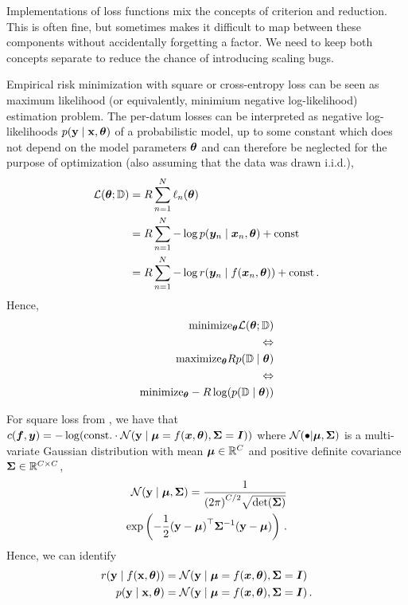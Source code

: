 \begin{caveat}
  Implementations of loss functions mix the concepts of criterion and reduction.
  This is often fine, but sometimes makes it difficult to map between these components without accidentally forgetting a factor.
  We need to keep both concepts separate to reduce the chance of introducing scaling bugs.
\end{caveat}

Empirical risk minimization with square or cross-entropy loss can be seen as maximum likelihood (or equivalently, minimium negative log-likelihood) estimation problem.
The per-datum losses can be interpreted as negative log-likelihoods $p({\mathbf{y}} \mid {\mathbf{x}}, {\bm{\theta}})$ of a probabilistic model, up to some constant which does not depend on the model parameters ${\bm{\theta}}$ and can therefore be neglected for the purpose of optimization (also assuming that the data was drawn i.i.d.),
\begin{align*}
  {\mathcal{L}}({\bm{\theta}}; {\mathbb{D}})
  &=
    R \sum_{n=1}^N \ell_n({\bm{\theta}})
  \\
  &=
    R \sum_{n=1}^N - \log p({\bm{y}}_n \mid {\bm{x}}_n, {\bm{\theta}}) + \text{const}
  \\
  &=
    R \sum_{n=1}^N - \log r({\bm{y}}_n \mid f({\bm{x}}_n, {\bm{\theta}})) + \text{const}\,.
\end{align*}
Hence,
\begin{align*}
  \mathrm{minimize}_{{\bm{\theta}}} {\mathcal{L}}({\bm{\theta}}; {\mathbb{D}})
  \\
  \Leftrightarrow
  \\
  \mathrm{maximize}_{{\bm{\theta}}} R p({\mathbb{D}} \mid {\bm{\theta}})
  \\
  \Leftrightarrow
  \\
  \mathrm{minimize}_{{\bm{\theta}}} - R \log(p({\mathbb{D}} \mid {\bm{\theta}}))
\end{align*}

\begin{example}
  For square loss from , we have that $c({\bm{f}}, {\bm{y}}) = - \log( \mathrm{const.}
  \cdot {\mathcal{N}}({\mathbf{y}} \mid {\bm{\mu}} = f({\bm{x}}, {\bm{\theta}}), {\bm{\Sigma}} = {\bm{I}}))$ where ${\mathcal{N}}(\bullet | {\bm{\mu}}, {\bm{\Sigma}})$ is a multi-variate Gaussian distribution with mean ${\bm{\mu}} \in {\mathbb{R}}^C$ and positive definite covariance ${\bm{\Sigma}} \in {\mathbb{R}}^{C \times C}$,
  \begin{align*}
    {\mathcal{N}}({\mathbf{y}} \mid {\bm{\mu}}, {\bm{\Sigma}})
    =
    \frac{1}{{(2\pi)}^{C/2} \sqrt{\det({\bm{\Sigma}})}}
    \\
    \exp\left( -\frac{1}{2} {({\mathbf{y}} - {\bm{\mu}})}^\top {\bm{\Sigma}}^{-1} ({\mathbf{y}} - {\bm{\mu}}) \right)\,.
  \end{align*}
  Hence, we can identify
  \begin{align*}
    r({\mathbf{y}} \mid f({\mathbf{x}}, {\bm{\theta}})) &= {\mathcal{N}}({\mathbf{y}} \mid {\bm{\mu}} = f({\bm{x}}, {\bm{\theta}}), {\bm{\Sigma}} = {\bm{I}})\,
    \\
    p({\mathbf{y}} \mid {\mathbf{x}}, {\bm{\theta}}) &= {\mathcal{N}}({\mathbf{y}} \mid {\bm{\mu}} = f({\bm{x}}, {\bm{\theta}}), {\bm{\Sigma}} = {\bm{I}})\,.
  \end{align*}
\end{example}

